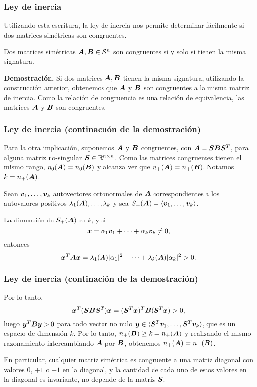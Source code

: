 \documentclass[aspectratio=169,12pt,spanish]{beamer}
\begin{document}

\begin{frame}
\frametitle{Ley de inercia}

Utilizando esta escritura, la ley de inercia nos permite determinar fácilmente si dos matrices simétricas son congruentes.

\begin{theorem}
Dos matrices simétricas $\bm{A}, \bm{B} \in {\mathcal S^n}$ son congruentes si y solo si tienen la misma signatura.
\end{theorem}

\textbf{Demostración.}
Si dos matrices $\bm{A}, \bm{B}$ tienen la misma signatura, utilizando la construcción anterior, obtenemos que $\bm{A}$ y $\bm{B}$ son congruentes a la misma matriz de inercia. Como la relación de congruencia es una relación de equivalencia, las matrices $\bm{A}$ y $\bm{B}$ son congruentes.
\end{frame}


\begin{frame}
\frametitle{Ley de inercia (continacuón de la demostración)}

Para la otra implicación, suponemos $\bm{A}$ y $\bm{B}$ congruentes, con $\bm{A} = \bm{S} \bm{B} \bm{S}^T$, para alguna matriz no-singular $\bm{S} \in \mathbb{R}^{n\times n}$. Como las matrices congruentes tienen el mismo rango, $n_0(\bm{A}) = n_0(\bm{B})$ y alcanza ver que $n_+(\bm{A}) = n_+(\bm{B})$. Notamos $k = n_+(\bm{A})$.

Sean $\bm{v}_1, \dots, \bm{v}_k$ autovectores ortonormales de $\bm{A}$ correspondientes a los autovalores positivos $\lambda_1(\bm{A}), \dots, \lambda_{k}$ y sea $S_+(\bm{A}) = \langle \bm{v}_1, \dots, \bm{v}_{k} \rangle$.

La dimensión de $S_+(\bm{A})$ es $k$, y si
$$\bm{x} = \alpha_1 \bm{v}_1 + \dots + \alpha_k \bm{v}_{k} \neq 0,$$
entonces
$$\bm{x}^T \bm{A} \bm{x} = \lambda_1(\bm{A}) |\alpha_1|^2 + \dots + \lambda_{k}(\bm{A}) |\alpha_k|^2 > 0.$$

\end{frame}


\begin{frame}
\frametitle{Ley de inercia (continación de la demostración)}

Por lo tanto,
$$
\bm{x}^T (\bm{S} \bm{B} \bm{S}^T) \bm{x} = (\bm{S}^T\bm{x})^T \bm{B} (\bm{S}^T \bm{x}) > 0,
$$
luego $\bm{y}^T \bm{B} \bm{y} > 0$ para todo vector no nulo $\bm{y} \in \langle \bm{S}^T \bm{v}_1, \dots, \bm{S}^T \bm{v}_k \rangle$, que es un espacio de dimensión $k$. Por lo tanto, $n_+(\bm{B}) \ge k = n_+(\bm{A})$ y realizando el mismo razonamiento intercambiando $\bm{A}$ por $\bm{B}$, obtenemos $n_+(\bm{A}) = n_+(\bm{B})$.

\vspace{1cm}

En particular, cualquier matriz simétrica es congruente a una matriz diagonal con valores $0$, $+1$ o $-1$ en la diagonal, y la cantidad de cada uno de estos valores en la diagonal es invariante, no depende de la matriz $\bm{S}$.

\end{frame}
\end{document}
